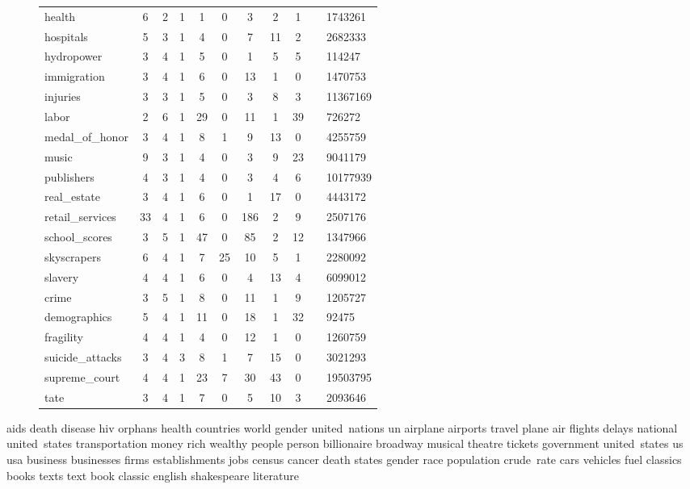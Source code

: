 \begin{figure*}
\begin{tabular}{ l | c c | c c c c c c |}
health & 6 & 2 & 1 & 1 & 0 & 3 & 2 & 1 &  & 1743261\\
hospitals & 5 & 3 & 1 & 4 & 0 & 7 & 11 & 2 &  & 2682333\\
hydropower & 3 & 4 & 1 & 5 & 0 & 1 & 5 & 5 &  & 114247\\
immigration & 3 & 4 & 1 & 6 & 0 & 13 & 1 & 0 &  & 1470753\\
injuries & 3 & 3 & 1 & 5 & 0 & 3 & 8 & 3 &  & 11367169\\
labor & 2 & 6 & 1 & 29 & 0 & 11 & 1 & 39 &  & 726272\\
medal_of_honor & 3 & 4 & 1 & 8 & 1 & 9 & 13 & 0 &  & 4255759\\
music & 9 & 3 & 1 & 4 & 0 & 3 & 9 & 23 &  & 9041179\\
publishers & 4 & 3 & 1 & 4 & 0 & 3 & 4 & 6 &  & 10177939\\
real_estate & 3 & 4 & 1 & 6 & 0 & 1 & 17 & 0 &  & 4443172\\
retail_services & 33 & 4 & 1 & 6 & 0 & 186 & 2 & 9 &  & 2507176\\
school_scores & 3 & 5 & 1 & 47 & 0 & 85 & 2 & 12 &  & 1347966\\
skyscrapers & 6 & 4 & 1 & 7 & 25 & 10 & 5 & 1 &  & 2280092\\
slavery & 4 & 4 & 1 & 6 & 0 & 4 & 13 & 4 &  & 6099012\\
crime & 3 & 5 & 1 & 8 & 0 & 11 & 1 & 9 &  & 1205727\\
demographics & 5 & 4 & 1 & 11 & 0 & 18 & 1 & 32 &  & 92475\\
fragility & 4 & 4 & 1 & 4 & 0 & 12 & 1 & 0 &  & 1260759\\
suicide_attacks & 3 & 4 & 3 & 8 & 1 & 7 & 15 & 0 &  & 3021293\\
supreme_court & 4 & 4 & 1 & 23 & 7 & 30 & 43 & 0 &  & 19503795\\
tate & 3 & 4 & 1 & 7 & 0 & 5 & 10 & 3 &  & 2093646\\
\end{tabular}
\end{figure*}
aids
death
disease
hiv
orphans
health
countries
world
gender
united~nations
un
airplane
airports
travel
plane
air
flights
delays
national
united~states
transportation
money
rich
wealthy
people
person
billionaire
broadway
musical
theatre
tickets
government
united~states
us
usa
business
businesses
firms
establishments
jobs
census
cancer
death
states
gender
race
population
crude~rate
cars
vehicles
fuel
classics
books
texts
text
book
classic
english
shakespeare
literature
